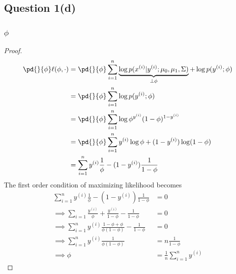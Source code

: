 \documentclass[11pt]{article}
\newcommand{\upi}[0]{^{(i)}}
\begin{document}
	\subsection{Question 1(d)}
	\subsubsection{$\phi$}
	\begin{proof}
	\begin{align}
		\pd{}{\phi} \ell (\phi, \cdot) &= \pd{}{\phi} \sum_{i=1}^n
		\underbrace{\log p(x\upi|y\upi; \mu_0, \mu_1, \Sigma)}_{\perp \phi}
		+ \log p(y\upi; \phi) \\
		&= \pd{}{\phi} \sum_{i=1}^n \log p(y\upi; \phi) \\
		&= \pd{}{\phi} \sum_{i=1}^n \log \phi^{y\upi} (1 - \phi)^{1 - y\upi} \\
		&= \pd{}{\phi} \sum_{i=1}^n y\upi \log \phi + (1 - y\upi) \log (1 - \phi) \\
		&= \sum_{i=1}^n y\upi \frac{1}{\phi} - (1 - y\upi) \frac{1}{1 - \phi}
	\end{align}
	The first order condition of maximizing likelihood becomes
	\begin{align}
		\sum_{i=1}^n y\upi \frac{1}{\phi} - (1 - y\upi) \frac{1}{1 - \phi} &= 0 \\
		\implies \sum_{i=1} \frac{y\upi}{\phi} + \frac{y\upi}{1 - \phi} - \frac{1}{1 - \phi} &= 0 \\
		\implies \sum_{i=1}^n y\upi \frac{1 - \phi + \phi}{\phi (1 - \phi)} - \frac{1}{1 - \phi} &= 0 \\
		\implies \sum_{i=1}^n y\upi \frac{1}{\phi (1 - \phi)} &= n \frac{1}{1-\phi} \\
		\implies \phi &= \frac{1}{n} \sum_{i=1}^n y\upi
	\end{align}
	\end{proof}
	
\end{document}
